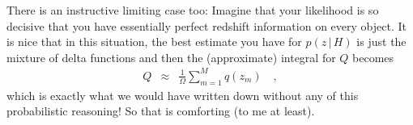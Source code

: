 \documentclass[12pt]{article}
\newcommand{\given}{\,|\,}
\begin{document}
There is an instructive limiting case too: Imagine that your
likelihood is so decisive that you have essentially perfect redshift
information on every object.  It is nice that in this situation, the
best estimate you have for $p(z \given H)$ is just the mixture of
delta functions and then the (approximate) integral for $Q$ becomes
\begin{eqnarray}\displaystyle
Q &\approx& \frac{1}{\Omega} \sum_{m=1}^M q(z_m)
\quad ,
\end{eqnarray}
which is exactly what we would have written down without any of this
probabilistic reasoning!  So that is comforting (to me at least).
\end{document}
